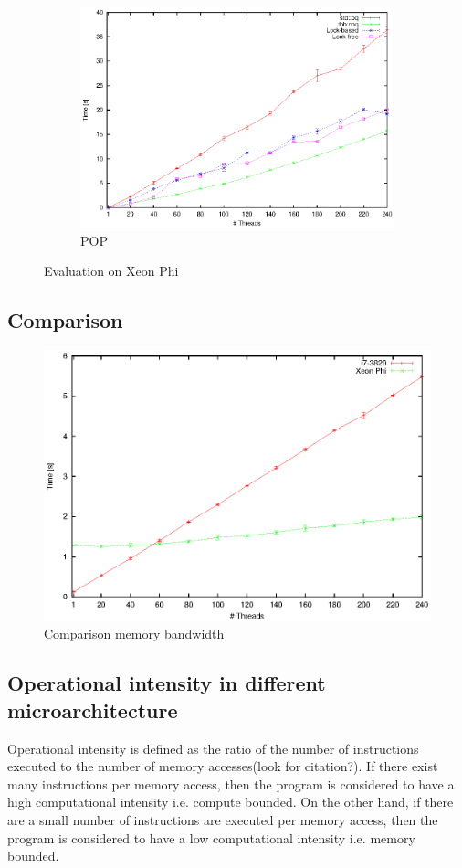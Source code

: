 \begin{figure}
\begin{subfigure}[b]{0.3\textwidth}
		\centering
		\includegraphics[width=\textwidth]{../plots/xp_pop/runtime_pop}
		\caption{POP}
		\label{fig:xp_pop}
	\end{subfigure}
	\caption{Evaluation on Xeon Phi}
	\label{fig:eval_xp}
\end{figure}


\subsection{Comparison}
\begin{figure}
	\centering
	\includegraphics[width=0.9\columnwidth]{../plots/comp_contains/runtime_contains}
	\caption{Comparison memory bandwidth}
	\label{fig:comp_contains}
\end{figure}

\subsection{Operational intensity in different microarchitecture}
Operational intensity is defined as the ratio of the number of instructions executed to the number of memory accesses(look for citation?). If there exist many instructions per memory access, then the program is considered to have a high computational intensity i.e. compute bounded. On the other hand, if there are a small number of instructions are executed per memory access, then the program is considered to have a low computational intensity i.e. memory bounded.

